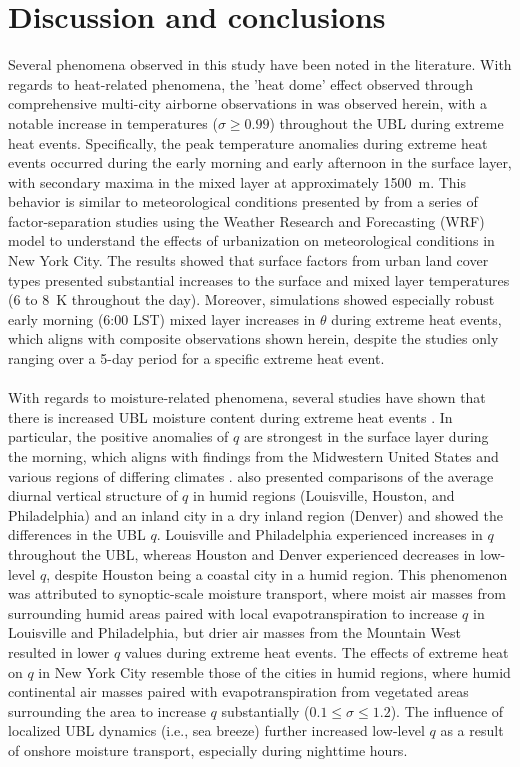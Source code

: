 \documentclass[11pt,a4paper]{article}
\begin{document}
\section{Discussion and conclusions} \label{section:discussion_conclusion}

Several phenomena observed in this study have been noted in the literature. With regards to heat-related phenomena, the 'heat dome' effect observed through comprehensive multi-city airborne observations in \citet{zhang2020} was observed herein, with a notable increase in temperatures ($\sigma \geq 0.99$) throughout the UBL during extreme heat events. Specifically, the peak temperature anomalies during extreme heat events occurred during the early morning and early afternoon in the surface layer, with secondary maxima in the mixed layer at approximately \SI{1500}{\meter}. This behavior is similar to meteorological conditions presented by  \citet{ortiz2018} from a series of factor-separation studies using the Weather Research and Forecasting (WRF) model to understand the effects of urbanization on meteorological conditions in New York City. The results showed that surface factors from urban land cover types presented substantial increases to the surface and mixed layer temperatures (6 to \SI{8}{\kelvin} throughout the day). Moreover, simulations showed  especially robust early morning (6:00 LST) mixed layer increases in $\theta$ during extreme heat events, which aligns with composite observations shown herein, despite the studies only ranging over a 5-day period for a specific extreme heat event.
\\ \\
With regards to moisture-related phenomena, several studies have shown that there is increased UBL moisture content during extreme heat events \citep{kunkel1996, pyrgou2020, zhang2020}. In particular, the positive anomalies of $q$ are strongest in the surface layer during the morning, which aligns with findings from the Midwestern United States \citep{kunkel1996} and various regions of differing climates \citep{zhang2020}. \citet{zhang2020} also presented comparisons of the average diurnal vertical structure of $q$ in humid regions (Louisville, Houston,   and Philadelphia) and an inland city in a dry inland region (Denver) and showed the differences in the UBL $q$. Louisville and Philadelphia experienced increases in $q$ throughout the UBL, whereas Houston and Denver experienced decreases in low-level $q$, despite Houston being a coastal city in a humid region. This phenomenon was attributed to synoptic-scale moisture transport, where moist air masses from surrounding humid areas paired with local evapotranspiration to increase $q$ in Louisville and Philadelphia, but drier air masses from the Mountain West resulted in lower $q$ values during extreme heat events. The effects of extreme heat on $q$ in New York City resemble those of the cities in humid regions, where humid continental air masses paired with evapotranspiration from vegetated areas surrounding the area to increase $q$ substantially ($0.1 \leq \sigma \leq 1.2$). The influence of localized UBL dynamics (i.e., sea breeze) further increased low-level $q$ as a result of onshore moisture transport, especially during nighttime hours.
\end{document}
